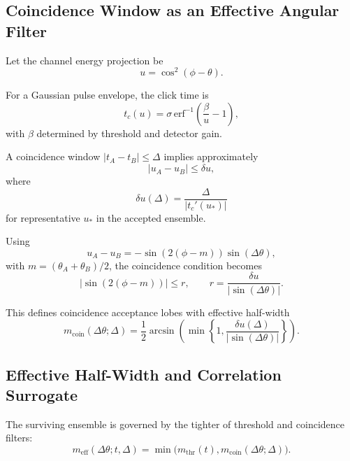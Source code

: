 \subsection{Coincidence Window as an Effective Angular Filter}

Let the channel energy projection be
\begin{equation}
u = \cos^2(\phi-\theta).
\end{equation}

For a Gaussian pulse envelope, the click time is
\begin{equation}
t_c(u) = \sigma\, \mathrm{erf}^{-1}\!\left(\frac{\beta}{u} - 1\right),
\end{equation}
with $\beta$ determined by threshold and detector gain.

A coincidence window $|t_A - t_B| \le \Delta$ implies approximately
\begin{equation}
|u_A - u_B| \le \delta u,
\end{equation}
where
\begin{equation}
\boxed{
\delta u(\Delta) = \frac{\Delta}{|t_c'(u_*)|}
}
\end{equation}
for representative $u_*$ in the accepted ensemble.

Using
\begin{equation}
u_A - u_B = -\sin(2(\phi - m)) \sin(\Delta\theta),
\end{equation}
with $m = (\theta_A+\theta_B)/2$, the coincidence condition becomes
\begin{equation}
|\sin(2(\phi - m))| \le r,
\qquad
r = \frac{\delta u}{|\sin(\Delta\theta)|}.
\end{equation}

This defines coincidence acceptance lobes with effective half-width
\begin{equation}
\boxed{
m_{\mathrm{coin}}(\Delta\theta;\Delta)
=
\frac{1}{2}
\arcsin\!\left(
\min\left\{1,\frac{\delta u(\Delta)}{|\sin(\Delta\theta)|}\right\}
\right).
}
\end{equation}

\subsection{Effective Half-Width and Correlation Surrogate}

The surviving ensemble is governed by the tighter of threshold and coincidence filters:
\begin{equation}
\boxed{
m_{\mathrm{eff}}(\Delta\theta; t,\Delta)
=
\min\big(
m_{\mathrm{thr}}(t),
m_{\mathrm{coin}}(\Delta\theta;\Delta)
\big).
}
\end{equation}

